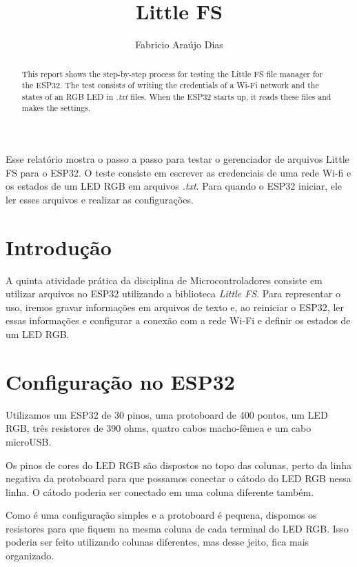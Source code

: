 \documentclass[12pt]{article}
\title{Little FS}
\author{Fabricio Araújo Dias}
\begin{document}
 

\maketitle

\begin{abstract}
  This report shows the step-by-step process for testing the Little FS file manager for the ESP32. The test consists of writing the credentials of a Wi-Fi network and the states of an RGB LED in \textit{.txt} files. When the ESP32 starts up, it reads these files and makes the settings.
\end{abstract}
     
\begin{resumo} 
  Esse relatório mostra o passo a passo para testar o gerenciador de arquivos Little FS para o ESP32. O teste consiste em escrever as credenciais de uma rede Wi-fi e os estados de um LED RGB em arquivos \textit{.txt}. Para quando o ESP32 iniciar, ele ler esses arquivos e realizar as configurações.
\end{resumo}


\section{Introdução}

A quinta atividade prática da disciplina de Microcontroladores consiste em utilizar arquivos no ESP32 utilizando a biblioteca \textit{Little FS}. Para representar o uso, iremos gravar informações em arquivos de texto e, ao reiniciar o ESP32, ler essas informações e configurar a conexão com a rede Wi-Fi e definir os estados de um LED RGB.

\section{Configuração no ESP32}

Utilizamos um ESP32 de 30 pinos, uma protoboard de 400 pontos, um LED RGB, três resistores de 390 ohms, quatro cabos macho-fêmea e um cabo microUSB.

Os pinos de cores do LED RGB são dispostos no topo das colunas, perto da linha negativa da protoboard para que possamos conectar o cátodo do LED RGB nessa linha. O cátodo poderia ser conectado em uma coluna diferente também.

Como é uma configuração simples e a protoboard é pequena, dispomos os resistores para que fiquem na mesma coluna de cada terminal do LED RGB. Isso poderia ser feito utilizando colunas diferentes, mas desse jeito, fica mais organizado.
\end{document}
